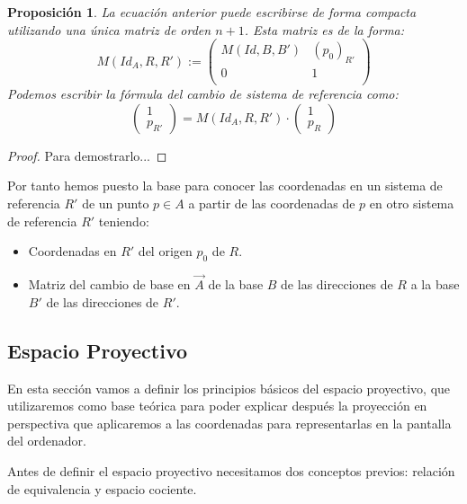 \documentclass[a4paper,11pt, oneside]{book}
\newtheorem{prop}{Proposición}
\begin{document}
\begin{prop}
La ecuación anterior puede escribirse de forma compacta utilizando una única matriz de orden $n+1$. Esta matriz es de la forma:
\begin{equation}
M(Id_A, R, R') := 
\begin{pmatrix}
M(Id, B, B') & (p_0)_{R'} \\
0 			 & 1 \\
\end{pmatrix}
\end{equation}
Podemos escribir la fórmula del cambio de sistema de referencia como:
\begin{equation}\label{cambio}
\begin{pmatrix}
1 \\
p_{R'}
\end{pmatrix}
 = M(Id_A, R, R')\cdot \begin{pmatrix}
 1 \\
 p_R
 \end{pmatrix}
\end{equation}
\end{prop}
\begin{proof}
	Para demostrarlo...
\end{proof}

Por tanto hemos puesto la base para conocer las coordenadas en un sistema de referencia $R'$ de un punto $p \in A$ a partir de las coordenadas de $p$ en otro sistema de referencia $R'$ teniendo:
\begin{itemize}
	\item Coordenadas en $R'$ del origen $p_0$ de $R$.
	\item Matriz del cambio de base en $\overrightarrow{A}$ de la base $B$ de las direcciones de $R$ a la base $B'$ de las direcciones de $R'$.
\end{itemize}

\subsection{Espacio Proyectivo}

En esta sección vamos a definir los principios básicos del espacio proyectivo, que utilizaremos como base teórica para poder explicar después la proyección en perspectiva que aplicaremos a las coordenadas para representarlas en la pantalla del ordenador.


Antes de definir el espacio proyectivo necesitamos dos conceptos previos: relación de equivalencia y espacio cociente.
\end{document}
